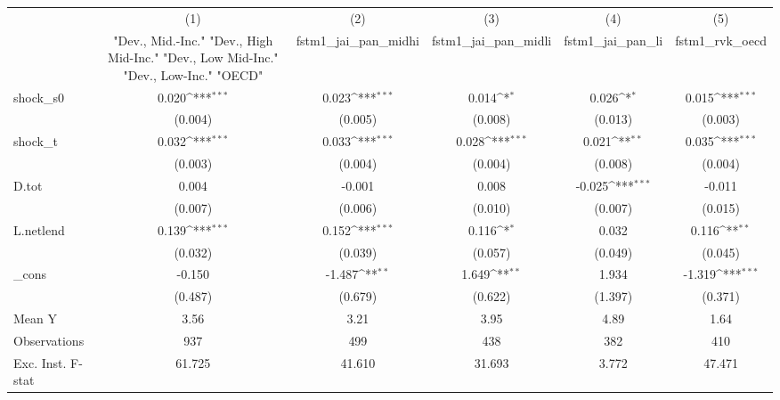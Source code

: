 {
\def\sym#1{\ifmmode^{#1}\else\(^{#1}\)\fi}
\begin{tabular}{l*{5}{c}}
\toprule
            &\multicolumn{1}{c}{(1)}&\multicolumn{1}{c}{(2)}&\multicolumn{1}{c}{(3)}&\multicolumn{1}{c}{(4)}&\multicolumn{1}{c}{(5)}\\
            &\multicolumn{1}{c}{ "Dev., Mid.-Inc." "Dev., High Mid-Inc." "Dev., Low Mid-Inc." "Dev., Low-Inc." "OECD" }&\multicolumn{1}{c}{fstm1\_jai\_pan\_midhi}&\multicolumn{1}{c}{fstm1\_jai\_pan\_midli}&\multicolumn{1}{c}{fstm1\_jai\_pan\_li}&\multicolumn{1}{c}{fstm1\_rvk\_oecd}\\
\midrule
shock\_s0    &       0.020\sym{***}&       0.023\sym{***}&       0.014\sym{*}  &       0.026\sym{*}  &       0.015\sym{***}\\
            &     (0.004)         &     (0.005)         &     (0.008)         &     (0.013)         &     (0.003)         \\
\addlinespace
shock\_t     &       0.032\sym{***}&       0.033\sym{***}&       0.028\sym{***}&       0.021\sym{**} &       0.035\sym{***}\\
            &     (0.003)         &     (0.004)         &     (0.004)         &     (0.008)         &     (0.004)         \\
\addlinespace
D.tot       &       0.004         &      -0.001         &       0.008         &      -0.025\sym{***}&      -0.011         \\
            &     (0.007)         &     (0.006)         &     (0.010)         &     (0.007)         &     (0.015)         \\
\addlinespace
L.netlend   &       0.139\sym{***}&       0.152\sym{***}&       0.116\sym{*}  &       0.032         &       0.116\sym{**} \\
            &     (0.032)         &     (0.039)         &     (0.057)         &     (0.049)         &     (0.045)         \\
\addlinespace
\_cons      &      -0.150         &      -1.487\sym{**} &       1.649\sym{**} &       1.934         &      -1.319\sym{***}\\
            &     (0.487)         &     (0.679)         &     (0.622)         &     (1.397)         &     (0.371)         \\
\midrule
Mean Y      &        3.56         &        3.21         &        3.95         &        4.89         &        1.64         \\
Observations&         937         &         499         &         438         &         382         &         410         \\
Exc. Inst. F-stat&      61.725         &      41.610         &      31.693         &       3.772         &      47.471         \\
\bottomrule
\end{tabular}
}
